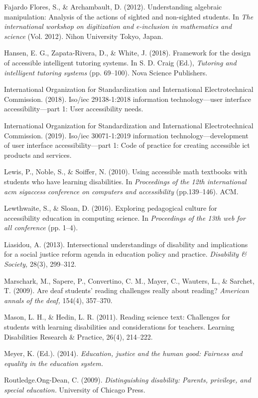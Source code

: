 \documentclass{sig-alternate} %
\begin{document}
Fajardo Flores, S., \& Archambault, D. (2012). Understanding algebraic manipulation: Analysis of the actions of sighted and non-sighted students. In \textit{The international workshop on digitization and e-inclusion in mathematics and science} (Vol. 2012). Nihon University Tokyo, Japan.

Hansen, E. G., Zapata-Rivera, D., \& White, J. (2018). Framework for the design of accessible intelligent tutoring systems. In S. D. Craig (Ed.), \textit{Tutoring and intelligent tutoring systems} (pp. 69–100). Nova Science Publishers.

International Organization for Standardization and International Electrotechnical Commission. (2018). Iso/iec 29138-1:2018 information technology—user interface accessibility—part 1: User accessibility needs.

International Organization for Standardization and International Electrotechnical Commission. (2019). Iso/iec 30071-1:2019 information technology—development of user interface accessibility—part 1: Code of practice for creating accessible ict products and services.

Lewis, P., Noble, S., \& Soiffer, N. (2010). Using accessible math textbooks with students who have learning disabilities. In \textit{Proceedings of the 12th international acm sigaccess conference on computers and accessibility} (pp.139–146). ACM.

Lewthwaite, S., \& Sloan, D. (2016). Exploring pedagogical culture for accessibility education in computing science. In \textit{Proceedings of the 13th web for all conference} (pp. 1–4).

Liasidou, A. (2013). Intersectional understandings of disability and implications for a social justice reform agenda in education policy and practice. \textit{Disability \& Society,} 28(3), 299–312.

Marschark, M., Sapere, P., Convertino, C. M., Mayer, C., Wauters, L., \& Sarchet, T. (2009). Are deaf students’ reading challenges really about reading? \textit{American annals of the deaf,} 154(4), 357–370.

Mason, L. H., \& Hedin, L. R. (2011). Reading science text: Challenges for students with learning disabilities and considerations for teachers. Learning Disabilities Research \& Practice, 26(4), 214–222.

Meyer, K. (Ed.). (2014). \textit{Education, justice and the human good: Fairness and equality in the education system.}

Routledge.Ong-Dean, C. (2009). \textit{Distinguishing disability: Parents, privilege, and special education.} University of Chicago Press.
\end{document}
